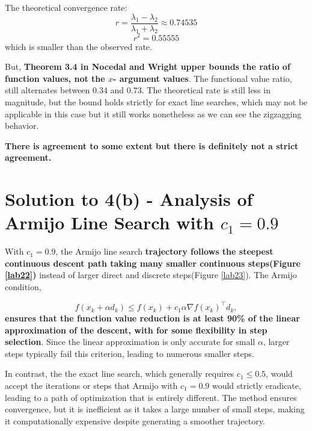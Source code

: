 \documentclass{article}
\begin{document}
The theoretical convergence rate:
\[
r = \frac{\lambda_1-\lambda_2}{\lambda_1+\lambda_2} \approx 0.74535  
\]
\[r^2 = 0.55555\]
which is smaller than the observed rate. 

But, \textbf{Theorem 3.4 in Nocedal and Wright upper bounds the ratio of function values, not the $x$- argument values}.
The functional value ratio, still alternates between $0.34$ and $0.73$. The theoretical rate is still less in magnitude, but the bound holds strictly for exact line searches, which may not be applicable in this case but it still works nonetheless as we can see the zigzagging behavior.

\textbf{ There is agreement to some extent but there is definitely not a strict agreement. 
}


\section*{Solution to 4(b) - Analysis of Armijo Line Search with \( c_1 = 0.9 \)}


With \( c_1 = 0.9 \), the Armijo line search \textbf{trajectory follows the steepest continuous descent path taking many smaller continuous steps(Figure \ref{lab22}) }instead of larger direct and discrete steps(Figure \ref{lab23}). The Armijo condition,

\textbf{\[
f(x_k + \alpha d_k) \leq f(x_k) + c_1\alpha\nabla f(x_k)^\top d_k,
\]
ensures that the function value reduction is at least 90\% of the linear approximation of the descent, with for some flexibility in step selection}. Since the linear approximation is only accurate for small \( \alpha \), larger steps typically fail this criterion, leading to numerous smaller steps. 


In contrast, the the exact line search, which generally requires \( c_1 \leq 0.5 \), would accept the iterations or steps that Armijo with \( c_1 = 0.9 \) would strictly eradicate, leading to a path of optimization that is entirely different. The method ensures convergence, but it is inefficient as it takes a large number of small steps, making it computationally expensive despite generating a smoother trajectory.
\end{document}

